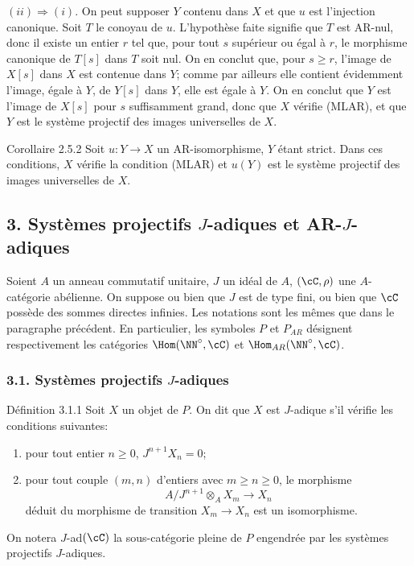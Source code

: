 $(ii)\Rightarrow(i)$. On peut supposer $Y$ contenu dans $X$ et que $u$ est l'injection canonique. Soit $T$ le conoyau de $u$. L'hypothèse faite signifie que $T$ est AR-nul, donc il existe un entier $r$ tel que, pour tout $s$ supérieur ou égal à $r$, le morphisme canonique de $T[s]$ dans $T$ soit nul. On en conclut que, pour $s\ge r$, l'image de $X[s]$ dans $X$ est contenue dans $Y$; comme par ailleurs elle contient évidemment l'image, égale à $Y$, de $Y[s]$ dans $Y$, elle est égale à $Y$. On en conclut que $Y$ est l'image de $X[s]$ pour $s$ suffisamment grand, donc que $X$ vérifie (MLAR), et que $Y$ est le
système projectif des images universelles de $X$.

\begin{statement}{Corollaire 2.5.2}
Soit $u:Y\to X$ un AR-isomorphisme, $Y$ étant strict. Dans ces conditions, $X$ vérifie la condition (MLAR) et $u(Y)$ est le système projectif des images universelles de $X$.
\end{statement}

\subsection*{3. Systèmes projectifs $J$-adiques et AR-$J$-adiques}
Soient $A$ un anneau commutatif unitaire, $J$ un idéal de $A$, $(\cC,\rho)$ une $A$-catégorie abélienne. On suppose ou bien que $J$ est de type fini, ou bien que $\cC$ possède des sommes directes infinies. Les notations sont les mêmes que dans le paragraphe précédent. En particulier, les symboles $P$ et $P_{AR}$ désignent respectivement les catégories $\Hom(\NN^\circ,\cC)$ et $\Hom_{AR}(\NN^\circ,\cC)$.

\subsubsection*{3.1. Systèmes projectifs $J$-adiques}
\begin{statement}{Définition 3.1.1}
Soit $X$ un objet de $P$. On dit que $X$ est $J$-adique s'il vérifie les conditions suivantes:
\begin{enumerate}[label=(\roman*)]
\item pour tout entier $n\ge0$, $J^{n+1}X_n=0$;
\item pour tout couple $(m,n)$ d'entiers avec $m\ge n\ge0$, le morphisme
\[
A/J^{n+1}\otimes_A X_m\longrightarrow X_n
\]
déduit du morphisme de transition $X_m\to X_n$ est un isomorphisme.
\end{enumerate}
\end{statement}
On notera $J$-ad$(\cC)$ la sous-catégorie pleine de $P$ engendrée par les systèmes projectifs $J$-adiques.

